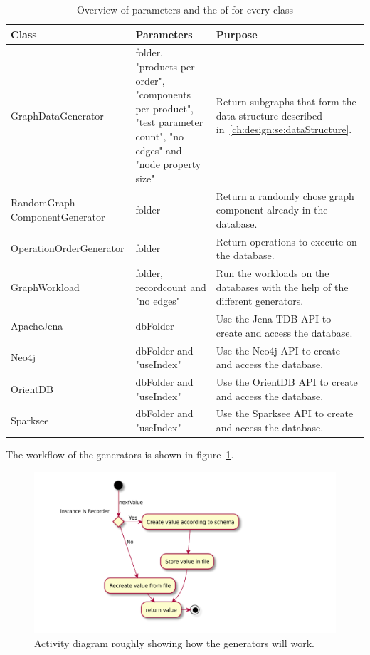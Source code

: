 \begin{table}[h!]
  \begin{minipage}{\textwidth}
    \begin{tabularx}{\textwidth}{ | X | X | X | }
      \hline
      Class & Parameters & Purpose \\ \hline
      GraphDataGenerator & folder, "products per order", "components per product", "test parameter count", "no edges" and "node property size" & Return subgraphs that form the data structure described in~\ref{ch:design:se:dataStructure}. \\ \hline
      RandomGraph-\newline ComponentGenerator & folder & Return a randomly chose graph component already in the database. \\ \hline
      OperationOrderGenerator & folder & Return operations to execute on the database. \\ \hline
      GraphWorkload & folder, recordcount and "no edges" & Run the workloads on the databases with the help of the different generators. \\ \hline
      ApacheJena & dbFolder & Use the Jena TDB API to create and access the database. \\ \hline
      Neo4j & dbFolder and "useIndex" & Use the Neo4j API to create and access the database. \\ \hline
      OrientDB & dbFolder and "useIndex" & Use the OrientDB API to create and access the database. \\ \hline
      Sparksee & dbFolder and "useIndex" & Use the Sparksee API to create and access the database. \\ \hline
    \end{tabularx}
  \end{minipage}
  \caption{Overview of parameters and the of for every class}
  \label{tab:designOverview}
\end{table}

The workflow of the generators is shown in figure~\ref{fig:generalGeneratorWorkflow}.

\begin{figure}[h!]
  \includegraphics[width=\textwidth]{images/generalGeneratorWorkflow}
  \caption{Activity diagram roughly showing how the generators will work.}
  \label{fig:generalGeneratorWorkflow}
\end{figure}

